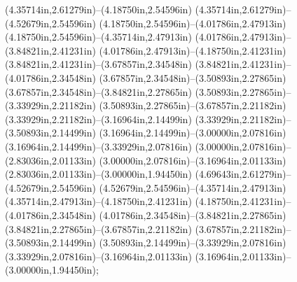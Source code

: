 (4.35714in,2.61279in)--(4.18750in,2.54596in) (4.35714in,2.61279in)--(4.52679in,2.54596in) (4.18750in,2.54596in)--(4.01786in,2.47913in) (4.18750in,2.54596in)--(4.35714in,2.47913in) (4.01786in,2.47913in)--(3.84821in,2.41231in) (4.01786in,2.47913in)--(4.18750in,2.41231in) (3.84821in,2.41231in)--(3.67857in,2.34548in) (3.84821in,2.41231in)--(4.01786in,2.34548in) (3.67857in,2.34548in)--(3.50893in,2.27865in) (3.67857in,2.34548in)--(3.84821in,2.27865in) (3.50893in,2.27865in)--(3.33929in,2.21182in) (3.50893in,2.27865in)--(3.67857in,2.21182in) (3.33929in,2.21182in)--(3.16964in,2.14499in) (3.33929in,2.21182in)--(3.50893in,2.14499in) (3.16964in,2.14499in)--(3.00000in,2.07816in) (3.16964in,2.14499in)--(3.33929in,2.07816in) (3.00000in,2.07816in)--(2.83036in,2.01133in) (3.00000in,2.07816in)--(3.16964in,2.01133in) (2.83036in,2.01133in)--(3.00000in,1.94450in) (4.69643in,2.61279in)--(4.52679in,2.54596in) (4.52679in,2.54596in)--(4.35714in,2.47913in) (4.35714in,2.47913in)--(4.18750in,2.41231in) (4.18750in,2.41231in)--(4.01786in,2.34548in) (4.01786in,2.34548in)--(3.84821in,2.27865in) (3.84821in,2.27865in)--(3.67857in,2.21182in) (3.67857in,2.21182in)--(3.50893in,2.14499in) (3.50893in,2.14499in)--(3.33929in,2.07816in) (3.33929in,2.07816in)--(3.16964in,2.01133in) (3.16964in,2.01133in)--(3.00000in,1.94450in);
